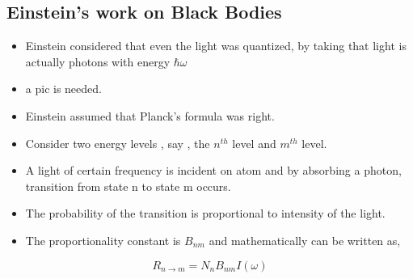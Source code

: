 \documentclass[aspectratio=169]{beamer}
\begin{document}
\subsection{Einstein's work on Black Bodies}

\begin{frame}{}

	\begin{itemize}

		\item Einstein considered that even the light was quantized, by taking that light is actually photons with energy $\hbar \omega$   \newline
		\item a pic is needed.

	\end{itemize}
	
\end{frame}

\begin{frame}{}

	\begin{itemize}
	
		\item Einstein assumed that Planck's formula was right. \newline
		\item Consider two energy levels , say , the $n^{th}$ level and $m^{th}$ level. \newline
		\item A light of certain frequency is incident on atom and by absorbing a photon, transition from state n to state m occurs. 
 
	\end{itemize}
	
\end{frame}

\begin{frame}

	\begin{itemize}

		\item The probability of the transition is proportional to intensity of the light. \newline
		\item The proportionality constant is $B_{nm}$ and mathematically can be written as,
		
	\end{itemize}
		
			\begin{equation}
					 R_{n \to m} = N_{n} B_{nm} I(\omega) 	 
			\end{equation} 
						
\end{frame}
\end{document}
